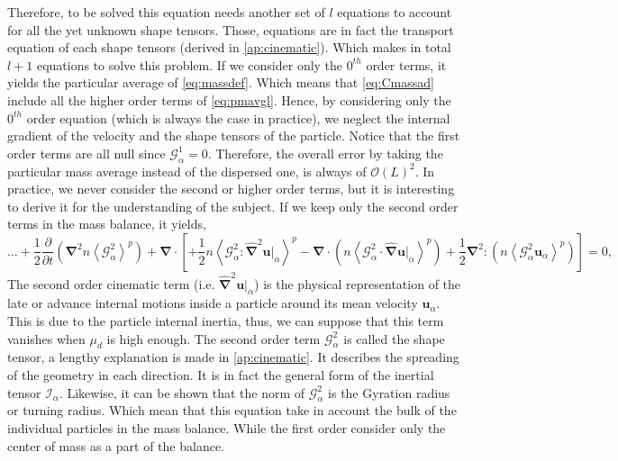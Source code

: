 Therefore, to be solved this equation needs another set of $l$ equations to account for all the yet unknown shape tensors. 
Those, equations are in fact the transport equation of each shape tensors (derived in \ref{ap:cinematic}). 
Which makes in total $l+1$ equations to solve this problem. 
If we consider only the $0^{th}$ order terms, it yields the particular average of \ref{eq:massdef}.
Which means that \ref{eq:Cmassad} include all the higher order terms of \ref{eq:pmavgl}. 
Hence, by considering only the $0^{th}$ order equation (which is always the case in practice), we neglect the internal gradient of the velocity and the shape tensors of the particle. 
Notice that the first order terms are all null since $\mathcal{G}^1_\alpha = 0$.
Therefore, the overall error by taking the particular mass average instead of the dispersed one, is always of $\mathcal{O}\left(L\right)^2$.
In practice, we never consider the second or higher order terms, but it is interesting to derive it for the understanding of the subject.
If we keep only the second order terms in the mass balance, it yields,
\begin{equation}
    \ldots +
    \frac{1}{2}
    \frac{\partial }{\partial t}\left(
          \bm{\nabla}^2  n \left<\mathcal{G}_\alpha^2\right>^p
    \right) 
    + \bm{\nabla}\cdot\left[
        + \frac{1}{2}  n \left<\mathcal{G}_\alpha^2 : \hat{\bm{\nabla}}^{2} \bm{u}|_\alpha \right>^p
        - \bm{\nabla} \cdot \left(n \left<\mathcal{G}_\alpha^2 \cdot \hat{\bm{\nabla}} \bm{u}|_\alpha \right>^p\right)
        + \frac{1}{2} \bm{\nabla}^{2} : \left(n \left<\mathcal{G}_\alpha^2 \bm{u}_\alpha  \right>^p\right)
    \right]
    =0,
\end{equation}
The second order cinematic term (i.e. $\hat{\bm{\nabla}}^{2} \bm{u}|_\alpha$) is the physical representation of the late or advance internal motions inside a particle around its mean velocity $\bm{u}_\alpha$.  
This is due to the particle internal inertia, thus, we can suppose that this term vanishes when $\mu_d$ is high enough.
The second order term $\mathcal{G}_\alpha^2$ is called the shape tensor, a lengthy explanation is made in \ref{ap:cinematic}. 
It describes the spreading of the geometry in each direction. 
It is in fact the general form of the inertial tensor $\mathcal{I}_\alpha$.
Likewise, it can be shown that the norm of $\mathcal{G}_\alpha^2$ is the Gyration radius or turning radius. 
Which mean that this equation take in account the bulk of the individual particles in the mass balance.
While the first order consider only the center of mass as a part of the balance. 
